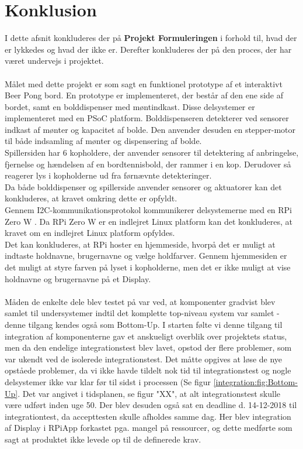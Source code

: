 \documentclass[Rapport/Rapport_main.tex]{subfiles}
\begin{document}
\section{Konklusion}
I dette afsnit konkluderes der på \textbf{Projekt Formuleringen} i forhold til, hvad der er lykkedes og hvad der ikke er. Derefter konkluderes der på den proces, der har været undervejs i projektet.\\\\
Målet med dette projekt er som sagt en funktionel prototype af et interaktivt Beer Pong bord. En prototype er implementeret, der består af den ene side af bordet, samt en bolddispenser med møntindkast. Disse delsystemer er implementeret med en PSoC platform\cite{psoc5lp}. Bolddispenseren detekterer ved sensorer indkast af mønter og kapacitet af bolde. Den anvender desuden en stepper-motor til både indsamling af mønter og dispensering af bolde.\\
Spillersiden har 6 kopholdere, der anvender sensorer til detektering af anbringelse, fjernelse og hændelsen af en bordtennisbold, der rammer i en kop. Derudover så reagerer lys i kopholderne ud fra førnævnte detekteringer.\\
Da både bolddispenser og spillerside anvender sensorer og aktuatorer kan det konkluderes, at kravet omkring dette er opfyldt. \\
Gennem I2C-kommunikationsprotokol\cite{i2c_protocol} kommunikerer delsystemerne med en RPi Zero W \cite{rpi_webpage}. Da RPi Zero W er en indlejret Linux platform kan det konkluderes, at kravet om en indlejret Linux platform opfyldes.\\
Det kan konkluderes, at RPi hoster en hjemmeside, hvorpå det er muligt at indtaste holdnavne, brugernavne og vælge holdfarver. Gennem hjemmesiden er det muligt at styre farven på lyset i kopholderne, men det er ikke muligt at vise holdnavne og brugernavne på et Display.\\\\
Måden de enkelte dele blev testet på var ved, at komponenter gradvist blev samlet til undersystemer indtil det komplette top-niveau system var samlet - denne tilgang kendes også som Bottom-Up. I starten følte vi denne tilgang til integration af komponenterne gav et anskueligt overblik over projektets status, men da den endelige integrationstest blev lavet, opstod der flere problemer, som var ukendt ved de isolerede integrationstest. Det måtte opgives at løse de nye opståede problemer, da vi ikke havde tildelt nok tid til integrationstest og nogle delsystemer ikke var klar før til sidst i processen (Se figur \ref{integration:fig:Bottom-Up}. Det var angivet i tidsplanen, se figur "XX", at alt integrationstest skulle være udført inden uge 50. Der blev desuden også sat en deadline d. 14-12-2018 til integrationtest, da accepttesten skulle afholdes samme dag. Her blev integration af Display i RPiApp forkastet pga. mangel på ressourcer, og dette medførte som sagt at produktet ikke levede op til de definerede krav. \\\\
\end{document}
